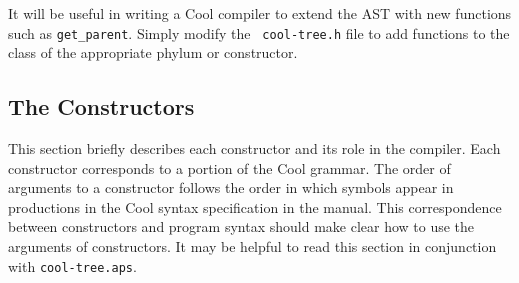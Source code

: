 \documentclass[11pt]{article}
\begin{document}
It will be useful in writing a Cool compiler to extend the AST with
new functions such as {\tt get\_parent}. Simply modify the {\tt
cool-tree.h} file to add functions to the class of the appropriate
phylum or constructor.



\subsection{The Constructors}
\label{sec-con}

This section briefly describes each
constructor and its role in the compiler.
Each constructor corresponds to a portion of the Cool grammar.  The
order of arguments to a constructor follows the order in which symbols
appear in productions in the Cool syntax specification in the manual.
This correspondence between constructors and program syntax should
make clear how to use the arguments of constructors.  It
may be helpful to read this section in conjunction with {\tt cool-tree.aps}.
\end{document}
